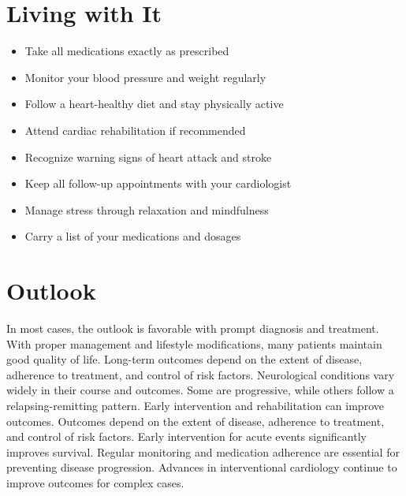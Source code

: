 \section{Living with It}
\begin{itemize}[noitemsep]
  \item Take all medications exactly as prescribed
  \item Monitor your blood pressure and weight regularly
  \item Follow a heart-healthy diet and stay physically active
  \item Attend cardiac rehabilitation if recommended
  \item Recognize warning signs of heart attack and stroke
  \item Keep all follow-up appointments with your cardiologist
  \item Manage stress through relaxation and mindfulness
  \item Carry a list of your medications and dosages
\end{itemize}
\section{Outlook}
In most cases, the outlook is favorable with prompt diagnosis and treatment. With proper management and lifestyle modifications, many patients maintain good quality of life. Long-term outcomes depend on the extent of disease, adherence to treatment, and control of risk factors. Neurological conditions vary widely in their course and outcomes. Some are progressive, while others follow a relapsing-remitting pattern. Early intervention and rehabilitation can improve outcomes. Outcomes depend on the extent of disease, adherence to treatment, and control of risk factors. Early intervention for acute events significantly improves survival. Regular monitoring and medication adherence are essential for preventing disease progression. Advances in interventional cardiology continue to improve outcomes for complex cases.
